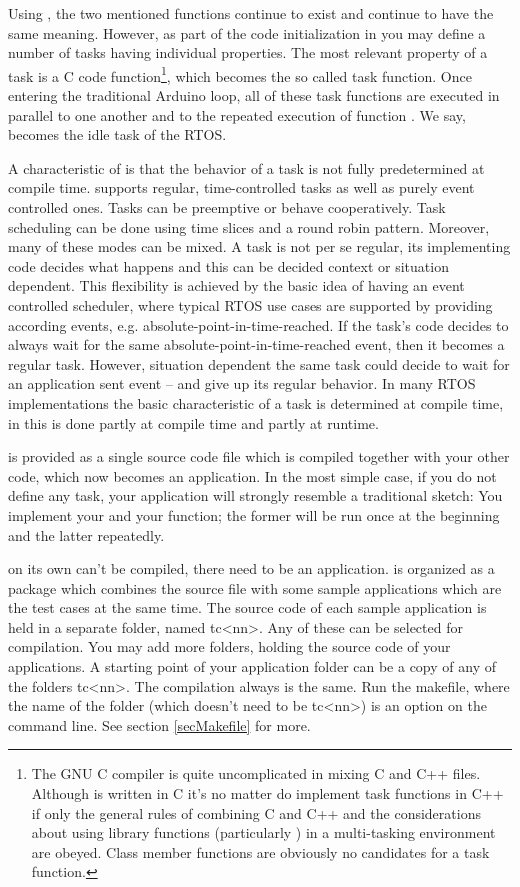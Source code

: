 Using \rtos{}, the two mentioned functions continue to exist and continue
to have the same meaning. However, as part of the code initialization in
 you may define a number of tasks having individual
properties. The most relevant property of a task is a C code
function\footnote{The GNU C compiler is quite uncomplicated in mixing C
and C++ files. Although \rtos{} is written in C it's no matter do
implement task functions in C++ if only the general rules of combining C
and C++ and the considerations about using library functions (particularly
) in a multi-tasking environment are obeyed. Class member
functions are obviously no candidates for a task function.}, which becomes
the so called task function. Once entering the traditional Arduino loop,
all of these task functions are executed in parallel to one another and to
the repeated execution of function . We say, 
becomes the idle task of the RTOS.

A characteristic of \rtos{} is that the behavior of a task is not fully
predetermined at compile time. \rtos{} supports regular, time-controlled
tasks as well as purely event controlled ones. Tasks can be preemptive or
behave cooperatively. Task scheduling can be done using time slices and a
round robin pattern. Moreover, many of these modes can be mixed. A task is
not per se regular, its implementing code decides what happens and this
can be decided context or situation dependent. This flexibility is
achieved by the basic idea of having an event controlled scheduler, where
typical RTOS use cases are supported by providing according events, e.g.
absolute-point-in-time-reached. If the task's code decides to always wait
for the same absolute-point-in-time-reached event, then it becomes a
regular task. However, situation dependent the same task could decide to
wait for an application sent event -- and give up its regular behavior. In
many RTOS implementations the basic characteristic of a task is determined
at compile time, in \rtos{} this is done partly at compile time and partly
at runtime.

\rtos{} is provided as a single source code file which is compiled together
with your other code, which now becomes an \rtos{} application. In the most
simple case, if you do not define any task, your application will strongly
resemble a traditional sketch: You implement your  and your
 function; the former will be run once at the beginning and
the latter repeatedly.

\rtos{} on its own can't be compiled, there need to be an application.
\rtos{} is organized as a package which combines the \rtos{} source file
with some sample applications which are the test cases at the same time.
The source code of each sample application is held in a separate folder,
named tc\textless nn\textgreater. Any of these can be selected for
compilation. You may add more folders, holding the source code of your
\rtos{} applications. A starting point of your application folder can be a
copy of any of the folders tc\textless nn\textgreater. The compilation
always is the same. Run the makefile, where the name of the folder (which
doesn't need to be tc\textless nn\textgreater) is an option on the
command line. See section \ref{secMakefile} for more.

